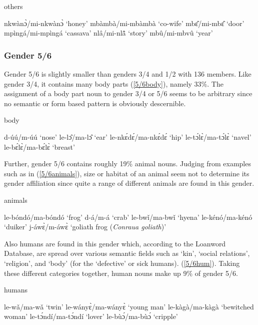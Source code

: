 \begin{exe}
\ex\label{3/4other}  others
\begin{xlist}
\ex nkwànɔ̀/mi-nkwànɔ̀ `honey'
\ex mbàmbà/mi-mbàmbà `co-wife'
\ex mbɛ̂/mi-mbɛ̂ `door'
\ex mpìngá/mi-mpìngá `cassava'
\ex nlâ/mi-nlã̂ `story'
\ex mbû/mi-mbvû `year'
\end{xlist}
\end{exe}


\subsubsection{Gender 5/6}
\label{sec:5/6}

Gender 5/6 is slightly smaller than genders 3/4 and 1/2 with 136 members. Like gender 3/4, it contains many body parts (\ref{5/6body}), namely 33\%. The assignment of a body part noun to gender 3/4 or 5/6 seems to be arbitrary since no semantic or form based pattern is obviously descernible.

\begin{exe}
\ex\label{5/6body} body
\begin{xlist}
\ex d-úú/m-úú `nose'
\ex le-lɔ̂/ma-lɔ̂ `ear'
\ex le-nkɛ́dɛ́/ma-nkɛ́dɛ́ `hip'
\ex le-tɔ́lɛ̀/ma-tɔ́lɛ̀ `navel'
\ex le-bɛ́lɛ̀/ma-bɛ́lɛ̀ `breast'
\end{xlist}
\end{exe}

\noindent Further, gender 5/6 contains roughly 19\% animal nouns. Judging from  examples such as in (\ref{5/6animals}), size or habitat of an animal seem not to determine its gender affiliation since quite a range of different animals are found in this gender.

\begin{exe}
\ex\label{5/6animals} animals
\begin{xlist}
\ex le-bóndó/ma-bóndó `frog'
\ex d-á/m-á `crab'
\ex le-bwǐ/ma-bwǐ `hyena'
\ex le-kénó/ma-kénó `duiker'
\ex j-áwɛ̀/m-áwɛ̀ `goliath frog ({\itshape Conraua goliath})'
\end{xlist}
\end{exe}

\noindent Also humans are found in this gender which, according to the Loanword Database, are spread over various semantic fields such as `kin', `social relations', `religion', and `body' (for the `defective' or sick humans). (\ref{5/6hum}). Taking these different categories together, human nouns make up 9\% of gender 5/6.

\begin{exe}
\ex\label{5/6hum} humans
\begin{xlist}
\ex le-wǎ/ma-wǎ `twin'
\ex le-wányɛ̀/ma-wányɛ̀ `young man'
\ex le-kàgà/ma-kàgà `bewitched woman'
\ex le-tɔ́ndí/ma-tɔ́ndí `lover'
\ex le-bùɔ́/ma-bùɔ́ `cripple'
\end{xlist}
\end{exe}

